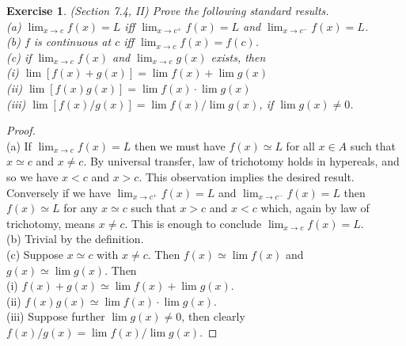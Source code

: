 \documentclass[a4paper, 11pt, openany]{book}
\theoremstyle{plain}
\newtheorem{exercise}{Exercise}[chapter]
\theoremstyle{plain}
\newcommand{\arr}{\rightarrow}
\begin{document}
  \begin{exercise}
    (Section 7.4, II) Prove the following standard results. \\
    (a) $\lim_{x \arr c} f(x)=L$ iff $\lim_{x \arr c^+} f(x)=L$ and $\lim_{x \arr c^-} f(x)=L$. \\
    (b) $f$ is continuous at $c$ iff $\lim_{x \arr c} f(x)=f(c)$. \\
    (c) if $\lim_{x \arr c} f(x)$ and $\lim_{x \arr c} g(x)$ exists, then \\
    (i) $\lim [f(x)+g(x)]= \lim f(x)+\lim g(x)$ \\
    (ii) $\lim [f(x) g(x)]= \lim f(x) \cdot \lim g(x)$ \\
    (iii) $\lim [f(x)/g(x)]=\lim f(x)/\lim g(x)$, if $\lim g(x) \not = 0$.
  \end{exercise}
  \begin{proof} $ $ \\
    (a) If $\lim_{x \arr c} f(x)=L$ then we must have $f(x) \simeq L$ for all $x \in A$ such that $x \simeq c$ and $x\not =c$. By universal transfer, law of trichotomy holds in hypereals, and so we have $x<c$ and $x>c$. This observation implies the desired result. Conversely if we have $\lim_{x \arr c^+} f(x)=L$ and $\lim_{x \arr c^-} f(x)=L$ then $f(x) \simeq L$ for any $x \simeq c$ such that $x>c$ and $x<c$ which, again by law of trichotomy, means $x \not =c$. This is enough to conclude $\lim_{x \arr c} f(x)=L$. \\
    (b) Trivial by the definition. \\
    (c) Suppose $x \simeq c$ with $x \not = c$. Then $f(x) \simeq \lim f(x)$ and $g(x) \simeq \lim g(x)$. Then \\
    (i) $f(x)+g(x) \simeq \lim f(x) + \lim g(x)$. \\
    (ii) $f(x) g(x) \simeq \lim f(x) \cdot \lim g(x)$. \\
    (iii) Suppose further $\lim g(x) \not = 0$, then clearly $f(x)/g(x) = \lim f(x)/\lim g(x)$.
  \end{proof}
\end{document}
